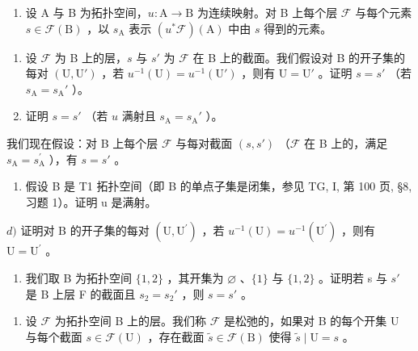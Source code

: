 \begin{enumerate}
\def\labelenumi{\arabic{enumi})}
\setcounter{enumi}{4}
\tightlist
\item
  设 A 与 B 为拓扑空间，\(u\colon\mathrm{A}\to\mathrm{B}\) 为连续映射。对 B 上每个层 \(\mathcal{F}\) 与每个元素 \(s\in\mathcal{F}(\mathrm{B})\) ，以 \(s_{\mathrm{A}}\) 表示 \((u^{*}\mathcal{F})(\mathrm{A})\) 中由 \(s\) 得到的元素。
\end{enumerate}

\begin{enumerate}
\def\labelenumi{\alph{enumi})}
\item
  设 \(\mathcal{F}\) 为 B 上的层，\(s\) 与 \(s'\) 为 \(\mathcal{F}\) 在 B 上的截面。我们假设对 B 的开子集的每对 \((\mathrm{U},\mathrm{U}')\) ，若 \(u^{-1}(\mathrm{U}) = u^{-1}(\mathrm{U}')\) ，则有 \(\mathrm{U} = \mathrm{U}'\) 。证明 \(s = s'\) （若 \(s_{\mathrm{A}} = s_{\mathrm{A}}'\) ）。
\item
  证明 \(s = s'\) （若 \(u\) 满射且 \(s_{\mathrm{A}} = s_{\mathrm{A}}'\) ）。
\end{enumerate}

我们现在假设：对 B 上每个层 \(\mathcal{F}\) 与每对截面 \((s,s')\) （\(\mathcal{F}\) 在 B 上的，满足 \(s_{\mathrm{A}} = s_{\mathrm{A}}^{\prime}\) ），有 \(s = s'\) 。

\begin{enumerate}
\def\labelenumi{\alph{enumi})}
\setcounter{enumi}{2}
\tightlist
\item
  假设 B 是 T1 拓扑空间（即 B 的单点子集是闭集，参见 TG, I, 第 100 页, §8, 习题 1）。证明 u 是满射。
\end{enumerate}

\(d)\) 证明对 B 的开子集的每对 \((\mathrm{U},\mathrm{U}^{\prime})\) ，若 \(u^{-1}(\mathrm{U}) = u^{-1}(\mathrm{U}^{\prime})\) ，则有 \(\mathrm{U} = \mathrm{U}^{\prime}\) 。

\begin{enumerate}
\def\labelenumi{\alph{enumi})}
\setcounter{enumi}{4}
\tightlist
\item
  我们取 B 为拓扑空间 \(\{1,2\}\) ，其开集为 \(\varnothing\) 、\(\{1\}\) 与 \(\{1,2\}\) 。证明若 s 与 \(s'\) 是 B 上层 F 的截面且 \(s_{2}=s_{2}'\) ，则 \(s=s'\) 。
\end{enumerate}

\begin{enumerate}
\def\labelenumi{\arabic{enumi})}
\setcounter{enumi}{5}
\tightlist
\item
  设 \(\mathcal{F}\) 为拓扑空间 B 上的层。我们称 \(\mathcal{F}\) 是松弛的，如果对 B 的每个开集 U 与每个截面 \(s \in \mathcal{F}(\mathrm{U})\) ，存在截面 \(\widetilde{s} \in \mathcal{F}(\mathrm{B})\) 使得 \(\widetilde{s} \mid \mathrm{U} = s\) 。
\end{enumerate}


